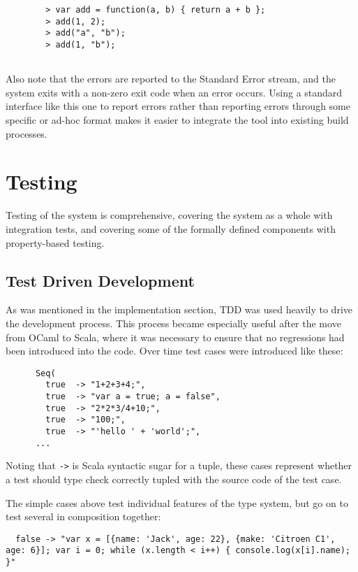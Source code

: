 \documentclass[british, twoside]{bhamthesis}
\theoremstyle{definition}
\begin{document}
      \begin{lstlisting}
        > var add = function(a, b) { return a + b };
        > add(1, 2);
        > add("a", "b");
        > add(1, "b");


      \end{lstlisting}

      Also note that the errors are reported to the Standard Error stream, and the system exits with a non-zero exit code when an error occurs. Using a standard interface like this one to report errors rather than reporting errors through some specific or ad-hoc format makes it easier to integrate the tool into existing build processes.

\chapter{Testing}
  Testing of the system is comprehensive, covering the system as a whole with integration tests, and covering some of the formally defined components with property-based testing.

  \section{Test Driven Development}
    As was mentioned in the implementation section, TDD was used heavily to drive the development process. This process became especially useful after the move from OCaml to Scala, where it was necessary to ensure that no regressions had been introduced into the code. Over time test cases were introduced like these:

    \begin{lstlisting}
      Seq(
        true  -> "1+2+3+4;",
        true  -> "var a = true; a = false",
        true  -> "2*2*3/4+10;",
        true  -> "100;",
        true  -> "'hello ' + 'world';",
      ...
    \end{lstlisting}

    Noting that \texttt{->} is Scala syntactic sugar for a tuple, these cases represent whether a test should type check correctly tupled with the source code of the test case.

    The simple cases above test individual features of the type system, but go on to test several in composition together:

    \begin{lstlisting}
  false -> "var x = [{name: 'Jack', age: 22}, {make: 'Citroen C1', age: 6}]; var i = 0; while (x.length < i++) { console.log(x[i].name); }"
    \end{lstlisting}
\end{document}
